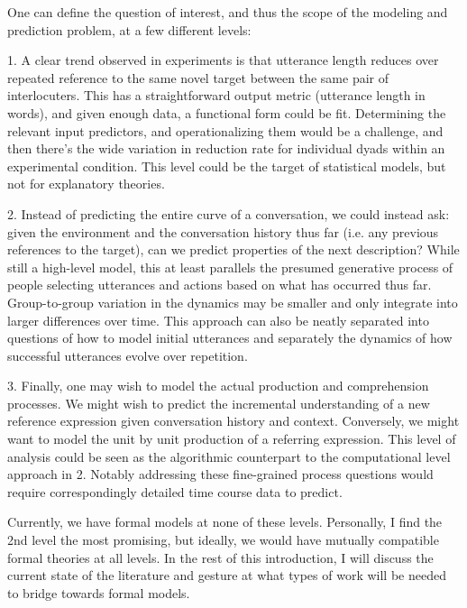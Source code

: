 \documentclass[]{article}
\begin{document}
	One can define the question of interest, and thus the scope of the modeling and prediction problem, at a few different levels:
	
	
	1. A clear trend observed in experiments is that utterance length reduces over repeated reference to the same novel target between the same pair of interlocuters. This has a straightforward output metric (utterance length in words), and given enough data, a functional form could be fit.  Determining the relevant input predictors, and operationalizing them would be a challenge, and then there's the wide variation in reduction rate for individual dyads within an experimental condition. This level could be the target of statistical models, but not for explanatory theories. 
	
	2. Instead of predicting the entire curve of a conversation, we could instead ask: given the environment and the conversation history thus far (i.e. any previous references to the target), can we predict properties of the next description? While still a high-level model, this at least parallels the presumed generative process of people selecting utterances and actions based on what has occurred thus far. Group-to-group variation in the dynamics may be smaller and only integrate into larger differences over time. This approach can also be neatly separated into questions of how to model initial utterances and separately the dynamics of how successful utterances evolve over repetition. 
	
	3. Finally, one may wish to model the actual production and comprehension processes. We might wish to predict the incremental understanding of a new reference expression given conversation history and context. Conversely, we might want to model the unit by unit production of a referring expression. This level of analysis could be seen as the algorithmic counterpart to the computational level approach in 2. Notably addressing these fine-grained process questions would require correspondingly detailed time course data to predict. 
	
	
	
	Currently, we have formal models at none of these levels. Personally, I find the 2nd level the most promising, but ideally, we would have mutually compatible formal theories at all levels. In the rest of this introduction, I will discuss the current state of the literature and gesture at what types of work will be needed to bridge towards formal models. 
	
\end{document}
